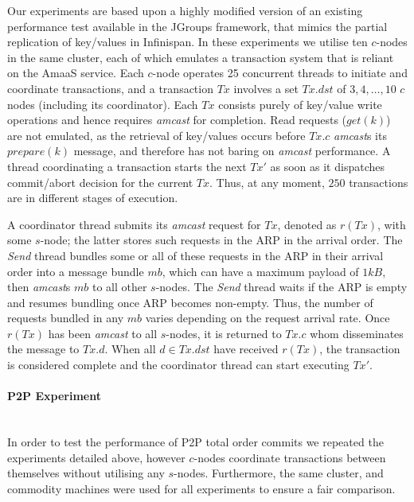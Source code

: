 Our experiments are based upon a highly modified version of an existing performance test available in the JGroups\citep{JGroups} framework, that mimics the partial replication of key/values in Infinispan\citep{Infinispan}.  In these experiments we utilise ten $c$-nodes in the same cluster, each of which emulates a transaction system that is reliant on the \textsf{AmaaS} service.  Each $c$-node operates 25 concurrent threads to initiate and coordinate transactions, and a transaction $Tx$ involves a set $Tx.dst$ of $3,4,\ldots,10$ $c$ nodes (including its coordinator). Each $Tx$ consists purely of key/value write operations and hence requires \emph{amcast} for completion. Read requests ($get(k)$) are not emulated, as the retrieval of key/values occurs before $Tx.c$ \emph{amcast}s its $prepare(k)$ message, and therefore has not baring on \emph{amcast} performance.  A thread coordinating a transaction starts the next $Tx'$ as soon as it dispatches commit/abort decision for the current $Tx$. Thus, at any moment, $250$ transactions are in different stages of execution.

A coordinator thread submits its \emph{amcast} request for $Tx$, denoted as $r(Tx)$, with some $s$-node; the latter stores such requests in the ARP in the arrival order. The \emph{Send} thread bundles some or all of these requests in the ARP in their arrival order into a message bundle $mb$, which can have a maximum payload of $1kB$, then \emph{amcast}s $mb$ to all other $s$-nodes.  The \emph{Send} thread waits if the ARP is empty and resumes bundling once ARP becomes non-empty. Thus, the number of requests bundled in any $mb$ varies depending on the request arrival rate. Once $r(Tx)$ has been \emph{amcast} to all $s$-nodes, it is returned to $Tx.c$ whom disseminates the message to $Tx.d$.  When all $d \in Tx.dst$ have received $r(Tx)$, the transaction is considered complete and the coordinator thread can start executing $Tx'$.  

\paragraph{P2P Experiment} \hspace{0pt} \\
In order to test the performance of P2P total order commits we repeated the  experiments detailed above, however $c$-nodes coordinate transactions between themselves without utilising any $s$-nodes.  Furthermore, the same cluster, and commodity machines were used for all experiments to ensure a fair comparison.   

